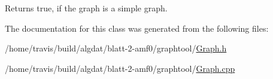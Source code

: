 \begin{DoxyReturn}{Returns}
true, if the graph is a simple graph. 
\end{DoxyReturn}


The documentation for this class was generated from the following files\-:\begin{DoxyCompactItemize}
\item 
/home/travis/build/algdat/blatt-\/2-\/amf0/graphtool/\hyperlink{_graph_8h}{Graph.\-h}\item 
/home/travis/build/algdat/blatt-\/2-\/amf0/graphtool/\hyperlink{_graph_8cpp}{Graph.\-cpp}\end{DoxyCompactItemize}
